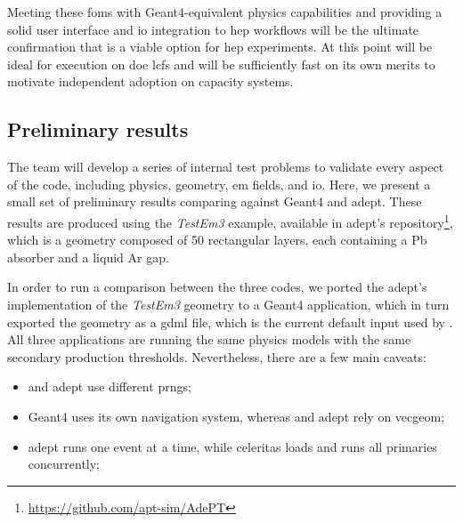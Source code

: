 Meeting these \acp{fom} with Geant4-equivalent physics capabilities and
providing a solid user interface and \ac{io} integration to \ac{hep} workflows
will be the ultimate confirmation that \celeritas is a viable option for
\ac{hep} experiments. At this point \celeritas will be ideal for execution on
\ac{doe} \acp{lcf} and will be sufficiently fast on its own merits to motivate
independent adoption on capacity systems.

\subsection{Preliminary results}

The \celeritas team will develop a series of internal test problems to validate
every aspect of the code, including physics, geometry, \ac{em} fields, and
\ac{io}. Here, we present a small set of preliminary results comparing
\celeritas against Geant4 and \acs{adept}. These results are produced using the
\emph{TestEm3} example, available in \acs{adept}'s repository\footnote {
    \url{https://github.com/apt-sim/AdePT}
},
which is a geometry composed of 50 rectangular layers, each containing a Pb
absorber and a liquid Ar gap.

In order to run a comparison between the three codes, we ported the
\acs{adept}'s implementation of the \emph{TestEm3} geometry to a Geant4
application, which in turn exported the geometry as a \acs{gdml} file, which is
the current default input used by \celeritas. All three applications are running
the same physics models with the same secondary production thresholds.
Nevertheless, there are a few main caveats:
\begin{itemize}[itemsep=0pt]
    \item \celeritas and \acs{adept} use different \acp{prng};
    \item Geant4 uses its own navigation system, whereas \celeritas and
    \acs{adept} rely on \acs{vecgeom};
    \item \acs{adept} runs one event at a time, while celeritas loads and runs
    all primaries concurrently;
\end{itemize}

